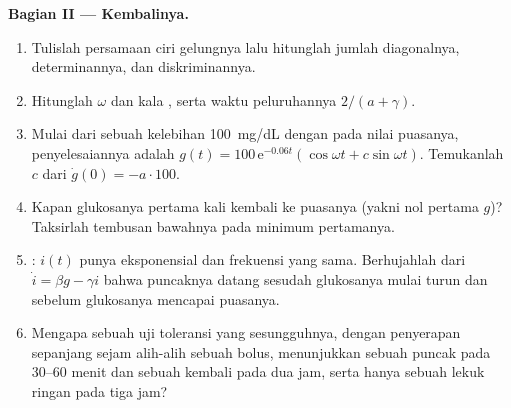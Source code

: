 \begin{problem}
\medskip
\noindent\textbf{Bagian II --- Kembalinya.}
\begin{enumerate}[resume]
  \item Tulislah persamaan ciri gelungnya lalu hitunglah
        jumlah diagonalnya, determinannya, dan diskriminannya.
  \item Hitunglah $\omega$ dan kala , serta
        waktu peluruhannya $2/(a + \gamma)$.
  \item Mulai dari sebuah kelebihan \qty{100}{mg/dL} dengan  pada nilai
        puasanya, penyelesaiannya adalah $g(t) = 100\,\mathrm{e}^{-0.06t}
        (\cos\omega t + c\sin\omega t)$. Temukanlah $c$ dari $\dot g(0) = -a\cdot
        100$.
  \item Kapan glukosanya pertama kali kembali ke puasanya (yakni nol pertama $g$)?
        Taksirlah tembusan bawahnya pada minimum pertamanya.
  \item {}: $i(t)$ punya eksponensial dan frekuensi yang sama. Berhujahlah
        dari $\dot i = \beta g - \gamma i$ bahwa puncaknya datang sesudah
        glukosanya mulai turun dan sebelum glukosanya mencapai puasanya.
  \item Mengapa sebuah uji toleransi yang sesungguhnya, dengan penyerapan sepanjang sejam
        alih-alih sebuah bolus, menunjukkan sebuah puncak pada 30--60 menit dan sebuah kembali
        pada dua jam, serta hanya sebuah lekuk ringan pada tiga jam?
\end{enumerate}


\end{problem}
